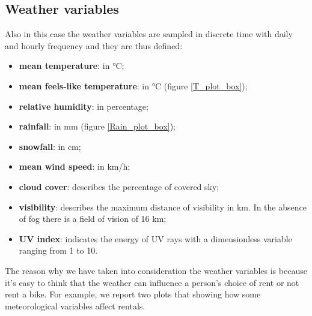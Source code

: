 \subsection{Weather variables}
Also in this case the weather variables are sampled in discrete time with daily and hourly frequency and they are thus defined:
\begin{itemize}
	\item \textbf{mean temperature}: in \unit{\degreeCelsius};
	\item \textbf{mean feels-like temperature}: in \unit{\degreeCelsius} (figure \ref{T_plot_box});
	\item \textbf{relative humidity}: in percentage;
	\item \textbf{rainfall}: in \unit{\milli\meter} (figure \ref{Rain_plot_box});
	\item \textbf{snowfall}: in \unit{\centi\meter};
	\item \textbf{mean wind speed}: in \unit{\kilo\meter/\hour};
	\item \textbf{cloud cover}: describes the percentage of covered sky;
	\item \textbf{visibility}: describes the maximum distance of visibility in \unit{\kilo\meter}. In the absence of fog there is a field of vision of \num{16} km;
	\item \textbf{UV index}: indicates the energy of UV rays with a dimensionless variable ranging from \num{1} to \num{10}.
\end{itemize}
The reason why we have taken into consideration the weather variables is because it's easy to think that the weather can influence a person's choice of rent or not rent a bike. For example, we report two plots that showing how some meteorological variables affect rentals.
\\
\\
\\
